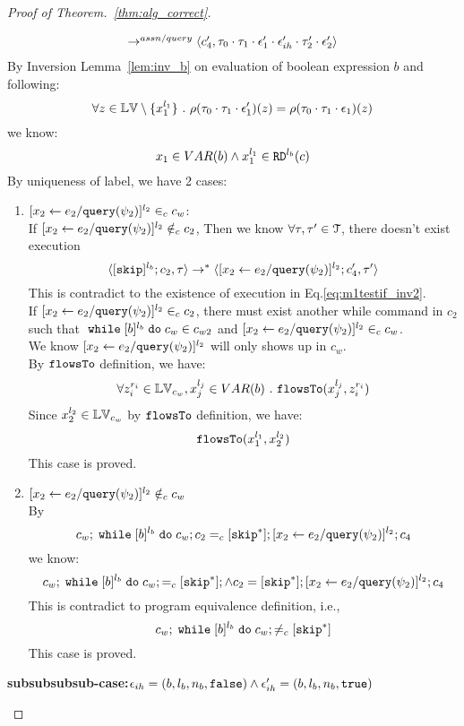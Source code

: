 \begin{proof}[Proof of Theorem.~\ref{thm:alg_correct}]
\begin{case}
\begin{subcase}
\begin{subsubcase}
\begin{subsubsubcase}
\begin{subproof}
\[\begin{array}{l}
  \rightarrow^{assn/query} 
  \langle {c}_4',  \mathtt{\tau}_0 \cdot \mathtt{\tau}_1 \cdot \mathtt{\epsilon}_1' \cdot \mathtt{\epsilon}_{ih}' \cdot \mathtt{\tau}_2' \cdot \mathtt{\epsilon}_2' \rangle 
\end{array}
 \]
By Inversion Lemma~\ref{lem:inv_b} on evaluation of boolean expression $b$ and following: 
\[
  \forall z \in \mathbb{LV} \setminus \{x_1^{l_1}\} ~.~
  \rho(\mathtt{\tau}_0 \cdot \mathtt{\tau}_1 \cdot \mathtt{\epsilon}_1')(z) = \rho(\mathtt{\tau}_0 \cdot \mathtt{\tau}_1 \cdot \mathtt{\epsilon}_1)(z)
\]
we know:
\[
  x_1 \in VAR(b) \land x_1^{l_1} \in \mathtt{RD}^{l_b}(c)
\]
%
 By uniqueness of label, we have 2 cases:
 \begin{enumerate}
 \item $[\mathrel{ {x}_2 \leftarrow e_2 / {\tt query}(\psi_2) }]^{l_2} \in_c c_w$:
 \\
 If $[\mathrel{ {x}_2 \leftarrow e_2 / {\tt query}(\psi_2) }]^{l_2} \notin_c c_2$,
 Then we know $\forall \mathtt{\tau}, \mathtt{\tau}' \in \mathcal{T}$, there doesn't exist execution
 \[
  \langle [\mathtt{skip}]^{l_b};c_2, \mathtt{\tau} \rangle \rightarrow^{*} 
  \langle [\mathrel{ {x}_2 \leftarrow e_2 / {\tt query}(\psi_2) }]^{l_2};{c}_4', \mathtt{\tau}' \rangle
 \]
 This is contradict to the existence of execution in Eq.\ref{eq:m1testif_inv2}.
 \\
  If $[\mathrel{ {x}_2 \leftarrow e_2 / {\tt query}(\psi_2) }]^{l_2} \in_c c_2$, there must exist another while command
   in $c_2$ such that 
  $\;\mathtt{while}\; [b]^{l_b} \;\mathtt{do}\; c_w \in c_{w2}$ and $[\mathrel{ {x}_2 \leftarrow e_2 / {\tt query}(\psi_2) }]^{l_2} \in_c c_w$.
  \\
  We know $[\mathrel{ {x}_2 \leftarrow e_2 / {\tt query}(\psi_2) }]^{l_2}$ will only shows up in $c_w$.
  \\
  By $\mathtt{flowsTo}$ definition, we have:
  \[
    \forall z_i^{r_i} \in \mathbb{LV}_{c_w}, x_j^{l_j} \in VAR(b) ~.~
    \mathtt{flowsTo}(x_j^{l_j}, z_i^{r_i})
  \]
  Since $x_2^{l_2} \in \mathbb{LV}_{c_w}$ by $\mathtt{flowsTo}$ definition, we have: 
  \[
    \mathtt{flowsTo}(x_1^{l_1}, x_2^{l_2})
  \]
  This case is proved.
 \item $[\mathrel{ {x}_2 \leftarrow e_2 / {\tt query}(\psi_2) }]^{l_2} \notin_c c_w$
 \\
 By
 \[
  c_w;\;\mathtt{while}\; [b]^{l_b} \;\mathtt{do}\; c_w; c_2 =_c [\mathtt{skip}^*]; [\mathrel{ {x}_2 \leftarrow e_2 / {\tt query}(\psi_2) }]^{l_2};{c}_4
\]
we know:
\[
  c_w;\;\mathtt{while}\; [b]^{l_b} \;\mathtt{do}\; c_w; =_c [\mathtt{skip}^*]; \land c_2 = [\mathtt{skip}^*]; [\mathrel{ {x}_2 \leftarrow e_2 / {\tt query}(\psi_2) }]^{l_2};{c}_4
\]
This is contradict to program equivalence definition, i.e.,
\[
  c_w;\;\mathtt{while}\; [b]^{l_b} \;\mathtt{do}\; c_w; \neq_c [\mathtt{skip}^*]
\]
This case is proved.
%
 \end{enumerate}
%
\textbf{subsubsubsub-case:}$\mathtt{\epsilon}_{ih} = (b, l_b, n_b, \mathtt{false}) \land \mathtt{\epsilon}_{ih}' = (b, l_b, n_b, \mathtt{true})$

\end{subproof}
\end{subsubsubcase}
\end{subsubcase}
\end{subcase}
\end{case}
\end{proof}
